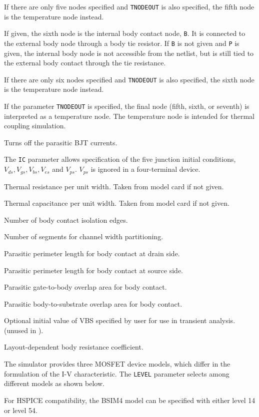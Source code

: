 \begin{Device}
\begin{Parameters}
If there are only five nodes specified and \texttt{TNODEOUT} is also specified,
the fifth node is the temperature node instead.


If given, the sixth node is the internal body contact node, \texttt{B}.  It is
connected to the external body node through a body tie resistor.  If \texttt{B}
is not given and \texttt{P} is given, the internal body node is not accessible
from the netlist, but is still tied to the external body contact through the
tie resistance.

If there are only six nodes specified and \texttt{TNODEOUT} is also specified,
the sixth node is the temperature node instead.


If the parameter \texttt{TNODEOUT} is specified, the final node (fifth, sixth,
or seventh) is interpreted as a temperature node.  The temperature node is
intended for thermal coupling simulation.


Turns off the parasitic BJT currents.

The \texttt{IC} parameter allows specification of the five junction initial
conditions, $V_{ds}, V_{gs}, V_{bs}, V_{es}$ and $V_{ps}$.  $V_{ps}$ is ignored
in a four-terminal device.

Thermal resistance per unit width.  Taken from model card if not given.

Thermal capacitance per unit width.  Taken from model card if not given.

Number of body contact isolation edges.

Number of segments for channel width partitioning.

Parasitic perimeter length for body contact at drain side.

Parasitic perimeter length for body contact at source side.

Parasitic gate-to-body overlap area for body contact.

Parasitic body-to-substrate overlap area for body contact.

Optional initial value of VBS specified by user for use in transient
analysis.  (unused in \Xyce{}).

Layout-dependent body resistance coefficient.

\end{Parameters}

\comments

The simulator provides three MOSFET device models, which differ in the
formulation of the I-V characteristic. The \texttt{LEVEL} parameter
selects among different models as shown below.

For HSPICE compatibility, the BSIM4 model can be specified with either
level 14 or level 54.

\end{Device}

